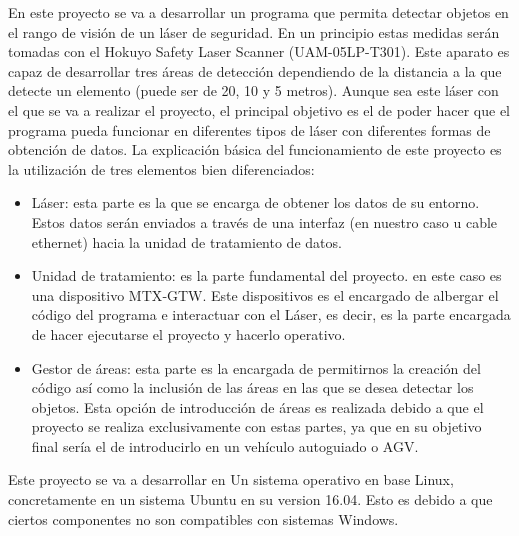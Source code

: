 
En este proyecto se va a desarrollar un programa que permita detectar objetos en el rango de visión de un láser de seguridad. En un principio estas medidas serán tomadas con el Hokuyo Safety Laser Scanner (UAM-05LP-T301). Este aparato es capaz de desarrollar tres áreas de detección dependiendo de la distancia a la que detecte un elemento (puede ser de 20, 10 y 5 metros). Aunque sea este láser con el que se va a realizar el proyecto, el principal objetivo es el de poder hacer que el programa pueda funcionar en diferentes tipos de láser con diferentes formas de obtención de datos.\hfill
\break\break
La explicación básica del funcionamiento de este proyecto es la utilización de tres elementos bien diferenciados:
\begin{itemize}
    \item Láser: esta parte es la que se encarga de obtener los datos de su entorno. Estos datos serán enviados a través de una interfaz (en nuestro caso u cable ethernet) hacia la unidad de tratamiento de datos.
    \item Unidad de tratamiento: es la parte fundamental del  proyecto. en este caso es una dispositivo MTX‐GTW. Este dispositivos es el encargado de albergar el código del programa e interactuar con el Láser, es decir, es la parte encargada de hacer ejecutarse el proyecto y hacerlo operativo.
    \item Gestor de áreas: esta parte es la encargada de permitirnos la creación del código así como la inclusión de las áreas en las que se desea detectar los objetos. Esta opción de introducción de áreas es realizada debido a que el proyecto se realiza exclusivamente con estas partes, ya que en su objetivo final sería el de introducirlo en un vehículo autoguiado o AGV.\hfill
\end{itemize}
\break\break
Este proyecto se va a desarrollar en Un sistema operativo en base Linux, concretamente en un sistema Ubuntu en su version 16.04. Esto es debido a que ciertos componentes no son compatibles con sistemas  Windows.
